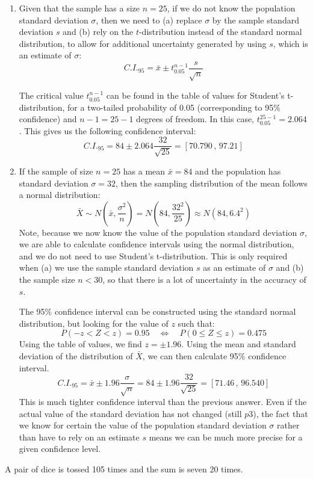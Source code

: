 \documentclass[a4paper, leqno, 12pt]{article} %
\newenvironment{top_enumerate}{
\begin{enumerate}
  \setlength{\itemsep}{2em}
  \setlength{\topsep}{-0pt}
  \setlength{\partopsep}{-0pt}
}{\end{enumerate}}
\begin{document}
\begin{top_enumerate}
\setcounter{equation}{0}  %
\begin{enumerate}
	\setlength{\topsep}{-0pt}
	\setlength{\partopsep}{-0pt}
	\setlength{\itemsep}{10pt}
			\item Given that the sample has a size $n={25}$, if we do not know the population standard deviation $\sigma$, then we need to (a) replace $\sigma$ by the sample standard deviation $s$ and (b) rely on the $t$-distribution instead of the standard normal distribution, to allow for additional uncertainty generated by using $s$, which is an estimate of $\sigma$:
	\[
	C.I._{95} = \bar x \pm t_{0.05}^{n-1} \frac{s}{\sqrt{n}}
	\]
	
	The critical value $t_{0.05}^{n-1}$ can be found in the table of values for Student's t-distribution, for a two-tailed probability of 0.05 (corresponding to 95\% confidence) and $n-1 = {{25}-1}$ degrees of freedom. In this case, $t_{0.05}^{{25}-1} = {2.064}$. This gives us the following confidence interval:
	\[
	C.I._{95} =  {84} \pm {2.064}\frac{{32}}{\sqrt{{25}}}  =  \left[{70.790} \, , \, {97.21}\right]
	\]
	 \quad \textbf{}
		\item If the sample of size $n={25}$ has a mean $\bar x = {84}$ and the population has standard deviation $\sigma={32}$, then the sampling distribution of the mean follows a normal distribution:
	\[
	\bar X \sim N \left(\bar x,\frac{\sigma^2}{n}\right) = N \left({84},\frac{{32}^2}{{25}}\right) \approx N \left({84},{6.4}^2\right)
	\]
	Note, because we now know the value of the population standard deviation $\sigma$, we are able to calculate confidence intervals using the normal distribution, and we do not need to use Student's t-distribution. This is only required when (a) we use the sample standard deviation $s$ as an estimate of $\sigma$ and (b) the sample size $n<30$, so that there is a lot of uncertainty in the accuracy of $s$.
	
	The 95\% confidence interval can be constructed using the standard normal distribution, but looking for the value of $z$ such that:
	\[
	P(-z < Z < z) = 0.95 \quad \iff \quad P(0 \le Z \le z) = 0.475
	\]
	Using the table of values, we find $z = \pm 1.96$. Using the mean and standard deviation of the distribution of $\bar X$, we can then calculate 95\% confidence interval.
	\[
	C.I._{95} = \bar x \pm 1.96 \frac{\sigma}{\sqrt{n}} = {84} \pm 1.96 \frac{{32}}{\sqrt{{25}}} = \left[{71.46} \, , \, {96.540}\right]
	\]
	This is much tighter confidence interval than the previous answer. Even if the actual value of the standard deviation has not changed (still $p3$), the fact that we know for certain the value of the population standard deviation $\sigma$ rather than have to rely on an estimate $s$ means we can be much more precise for a given confidence level.
	 \quad \textbf{}
\end{enumerate}\newpage
\item A pair of dice is tossed {105} times and the sum is seven {20} times.
 

\end{top_enumerate}
\end{document}
